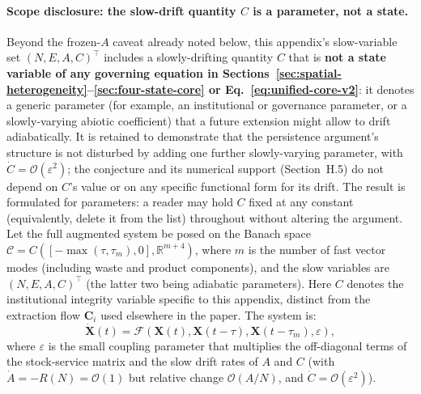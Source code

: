 \documentclass[twocolumn,10pt]{article}
\begin{document}
\paragraph{Scope disclosure: the slow-drift quantity $C$ is a parameter, not a state.} Beyond the frozen-$A$ caveat already noted below, this appendix's slow-variable set $(N,E,A,C)^\top$ includes a slowly-drifting quantity $C$ that is \textbf{not a state variable of any governing equation in Sections~\ref{sec:spatial-heterogeneity}--\ref{sec:four-state-core} or Eq.~\eqref{eq:unified-core-v2}}: it denotes a generic parameter (for example, an institutional or governance parameter, or a slowly-varying abiotic coefficient) that a future extension might allow to drift adiabatically. It is retained to demonstrate that the persistence argument's structure is not disturbed by adding one further slowly-varying parameter, with $\dot C=\mathcal O(\varepsilon^2)$; the conjecture and its numerical support (Section~H.5) do not depend on $C$'s value or on any specific functional form for its drift. The result is formulated for parameters: a reader may hold $C$ fixed at any constant (equivalently, delete it from the list) throughout without altering the argument. Let the full augmented system be posed on the Banach space $\mathcal{C} = C([-\max(\tau, \tau_m), 0], \mathbb{R}^{m+4})$, where $m$ is the number of fast vector modes (including waste and product components), and the slow variables are $(N, E, A, C)^\top$ (the latter two being adiabatic parameters). Here $C$ denotes the institutional integrity variable specific to this appendix, distinct from the extraction flow $\mathbf{C}_i$ used elsewhere in the paper. The system is:
\[
\dot{\mathbf{X}}(t) = \mathcal{F}(\mathbf{X}(t), \mathbf{X}(t-\tau), \mathbf{X}(t-\tau_m), \varepsilon),
\]
where $\varepsilon$ is the small coupling parameter that multiplies the off-diagonal terms of the stock-service matrix and the slow drift rates of $A$ and $C$ (with $\dot{A} = -R(N) = \mathcal{O}(1)$ but relative change $\mathcal{O}(A/N)$, and $\dot{C} = \mathcal{O}(\varepsilon^2)$).
\end{document}
